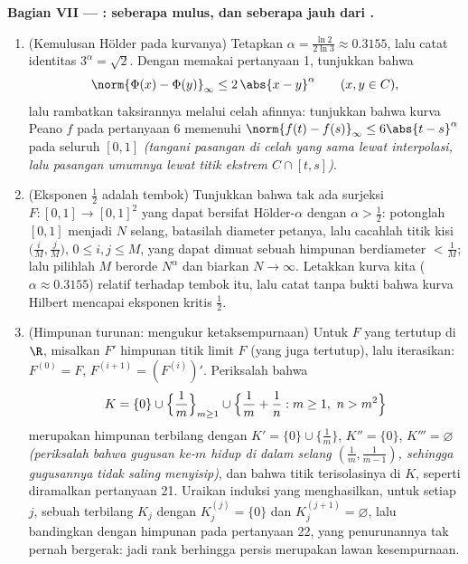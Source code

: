 \begin{problem}
\medskip
\noindent\textbf{Bagian VII --- : seberapa mulus, dan seberapa
jauh dari .}
\begin{enumerate}[resume]
  \item (Kemulusan Hölder pada kurvanya) Tetapkan $\alpha =
        \frac{\ln 2}{2\ln 3} \approx 0.3155$, lalu catat
        identitas $3^\alpha = \sqrt2$. Dengan memakai pertanyaan 1, tunjukkan
        bahwa
        \[
        \norm{\Phi(x) - \Phi(y)}_\infty \leq 2\,\abs{x -
        y}^\alpha \qquad (x, y \in C),
        \]
        lalu rambatkan taksirannya melalui celah afinnya:
        tunjukkan bahwa kurva Peano $f$ pada pertanyaan 6 memenuhi
        $\norm{f(t) - f(s)}_\infty \leq 6\abs{t - s}^\alpha$ pada
        seluruh $[0,1]$ \emph{(tangani pasangan di celah yang sama lewat
        interpolasi, lalu pasangan umumnya lewat titik ekstrem $C \cap [t, s]$)}.
  \item (Eksponen $\frac12$ adalah tembok) Tunjukkan bahwa tak ada
        surjeksi $F \colon [0,1] \to [0,1]^2$ yang dapat bersifat
        Hölder-$\alpha$ dengan $\alpha > \frac12$: potonglah $[0,1]$
        menjadi $N$ selang, batasilah diameter
        petanya, lalu cacahlah titik kisi
        $\bigl(\frac iM, \frac jM\bigr)$, $0 \leq i, j \leq M$,
        yang dapat dimuat sebuah himpunan berdiameter $< \frac1M$; lalu pilihlah
        $M$ berorde $N^\alpha$ dan biarkan $N \to \infty$. Letakkan
        kurva kita ($\alpha \approx 0.3155$) relatif terhadap tembok itu, lalu
        catat tanpa bukti bahwa kurva Hilbert
        mencapai eksponen kritis $\frac12$.
  \item (Himpunan turunan: mengukur ketaksempurnaan) Untuk $F$ yang tertutup
        di $\R$, misalkan $F'$ himpunan titik limit $F$ (yang juga
        tertutup), lalu iterasikan: $F^{(0)} = F$, $F^{(i+1)}
        = (F^{(i)})'$. Periksalah bahwa
        \[
        K = \{0\} \cup \Bigl\{\frac1m\Bigr\}_{m \geq 1} \cup
        \Bigl\{\frac1m + \frac1n : m \geq 1,\ n > m^2\Bigr\}
        \]
        merupakan himpunan  terbilang dengan $K' = \{0\} \cup
        \{\frac1m\}$, $K'' = \{0\}$, $K''' = \varnothing$
        \emph{(periksalah bahwa gugusan ke-$m$ hidup di dalam
        selang $(\frac1m, \frac1{m-1})$, sehingga gugusannya tidak
        saling menyisip)}, dan bahwa titik terisolasinya 
        di $K$, seperti diramalkan pertanyaan 21. Uraikan
        induksi yang menghasilkan, untuk setiap $j$, sebuah 
        terbilang $K_j$ dengan $K_j^{(j)} = \{0\}$ dan $K_j^{(j+1)} =
        \varnothing$, lalu bandingkan dengan himpunan  pada
        pertanyaan 22, yang penurunannya tak pernah bergerak: jadi
        rank berhingga persis merupakan lawan kesempurnaan.

\end{enumerate}
\end{problem}
